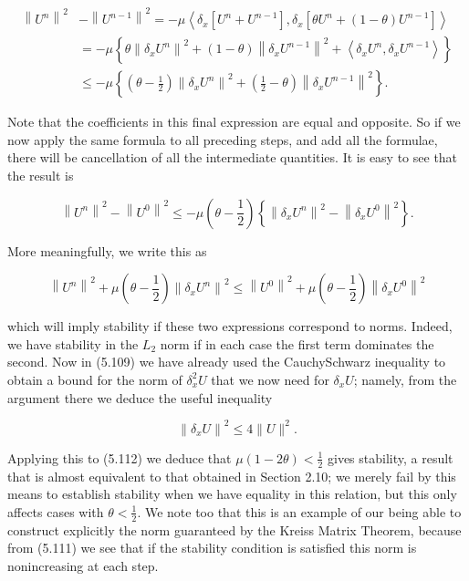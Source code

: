 \documentclass[10pt]{article}
\begin{document}
\[
\begin{aligned}
\left\|U^{n}\right\|^{2} & -\left\|U^{n-1}\right\|^{2}=-\mu\left\langle\delta_{x}\left[U^{n}+U^{n-1}\right], \delta_{x}\left[\theta U^{n}+(1-\theta) U^{n-1}\right]\right\rangle \\
& =-\mu\left\{\theta\left\|\delta_{x} U^{n}\right\|^{2}+(1-\theta)\left\|\delta_{x} U^{n-1}\right\|^{2}+\left\langle\delta_{x} U^{n}, \delta_{x} U^{n-1}\right\rangle\right\} \\
& \leq-\mu\left\{\left(\theta-\frac{1}{2}\right)\left\|\delta_{x} U^{n}\right\|^{2}+\left(\frac{1}{2}-\theta\right)\left\|\delta_{x} U^{n-1}\right\|^{2}\right\} .
\end{aligned}
\]

Note that the coefficients in this final expression are equal and opposite. So if we now apply the same formula to all preceding steps, and add all the formulae, there will be cancellation of all the intermediate quantities. It is easy to see that the result is

\[
\left\|U^{n}\right\|^{2}-\left\|U^{0}\right\|^{2} \leq-\mu\left(\theta-\frac{1}{2}\right)\left\{\left\|\delta_{x} U^{n}\right\|^{2}-\left\|\delta_{x} U^{0}\right\|^{2}\right\} .
\]

More meaningfully, we write this as

\[
\left\|U^{n}\right\|^{2}+\mu\left(\theta-\frac{1}{2}\right)\left\|\delta_{x} U^{n}\right\|^{2} \leq\left\|U^{0}\right\|^{2}+\mu\left(\theta-\frac{1}{2}\right)\left\|\delta_{x} U^{0}\right\|^{2}
\]

which will imply stability if these two expressions correspond to norms. Indeed, we have stability in the \(L_{2}\) norm if in each case the first term dominates the second. Now in (5.109) we have already used the CauchySchwarz inequality to obtain a bound for the norm of \(\delta_{x}^{2} U\) that we now need for \(\delta_{x} U\); namely, from the argument there we deduce the useful inequality

\[
\left\|\delta_{x} U\right\|^{2} \leq 4\|U\|^{2} .
\]

Applying this to (5.112) we deduce that \(\mu(1-2 \theta)<\frac{1}{2}\) gives stability, a result that is almost equivalent to that obtained in Section 2.10; we merely fail by this means to establish stability when we have equality in this relation, but this only affects cases with \(\theta<\frac{1}{2}\). We note too that this is an example of our being able to construct explicitly the norm guaranteed by the Kreiss Matrix Theorem, because from (5.111) we see that if the stability condition is satisfied this norm is nonincreasing at each step.
\end{document}
